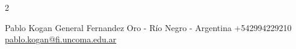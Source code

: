 \documentclass[lighthipster]{simplehipstercv}
\newlength{\rightcolwidth}
\begin{document}
\begin{paracol}{2}
\setlength{\parindent}{0pt}
\begin{minipage}[t]{\rightcolwidth}
\begin{center}\fontfamily{\sfdefault}\selectfont \color{black!70}
{\small Pablo Kogan
 General Fernandez Oro - Río Negro - Argentina  +542994229210 \newline{} \protect\url{pablo.kogan@fi.uncoma.edu.ar}
}
\end{center}
\end{minipage}

\end{paracol}
\end{document}
